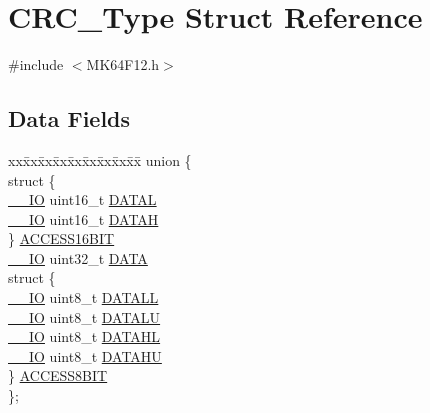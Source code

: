 \hypertarget{struct_c_r_c___type}{}\section{C\+R\+C\+\_\+\+Type Struct Reference}
\label{struct_c_r_c___type}


{\ttfamily \#include $<$M\+K64\+F12.\+h$>$}

\subsection*{Data Fields}
\begin{DoxyCompactItemize}
\item 
\begin{tabbing}
xx\=xx\=xx\=xx\=xx\=xx\=xx\=xx\=xx\=\kill
union \{\\
\>struct \{\\
\>\>\mbox{\hyperlink{core__cm4_8h_aec43007d9998a0a0e01faede4133d6be}{\_\_IO}} uint16\_t \mbox{\hyperlink{group___v_r_e_f___peripheral___access___layer_ga44be1f08c4a0d20cf3bdb48bf3663b70}{DATAL}}\\
\>\>\mbox{\hyperlink{core__cm4_8h_aec43007d9998a0a0e01faede4133d6be}{\_\_IO}} uint16\_t \mbox{\hyperlink{group___v_r_e_f___peripheral___access___layer_ga3eb82fbd05f954f025010a891f8028a9}{DATAH}}\\
\>\} \mbox{\hyperlink{group___v_r_e_f___peripheral___access___layer_ga8367369d606f023fe86d3d8587b86857}{ACCESS16BIT}}\\
\>\mbox{\hyperlink{core__cm4_8h_aec43007d9998a0a0e01faede4133d6be}{\_\_IO}} uint32\_t \mbox{\hyperlink{group___v_r_e_f___peripheral___access___layer_ga54cb6b41986c241ca85af803e9cd6101}{DATA}}\\
\>struct \{\\
\>\>\mbox{\hyperlink{core__cm4_8h_aec43007d9998a0a0e01faede4133d6be}{\_\_IO}} uint8\_t \mbox{\hyperlink{group___v_r_e_f___peripheral___access___layer_ga163f838a6515d380cb432907c426bc64}{DATALL}}\\
\>\>\mbox{\hyperlink{core__cm4_8h_aec43007d9998a0a0e01faede4133d6be}{\_\_IO}} uint8\_t \mbox{\hyperlink{group___v_r_e_f___peripheral___access___layer_ga1ef159257b3795329d68a57e5cc30643}{DATALU}}\\
\>\>\mbox{\hyperlink{core__cm4_8h_aec43007d9998a0a0e01faede4133d6be}{\_\_IO}} uint8\_t \mbox{\hyperlink{group___v_r_e_f___peripheral___access___layer_ga1ae430029da74ff7be05faacdc59576e}{DATAHL}}\\
\>\>\mbox{\hyperlink{core__cm4_8h_aec43007d9998a0a0e01faede4133d6be}{\_\_IO}} uint8\_t \mbox{\hyperlink{group___v_r_e_f___peripheral___access___layer_gae47c42d55e7ad2cdd02f961ee06b5573}{DATAHU}}\\
\>\} \mbox{\hyperlink{group___v_r_e_f___peripheral___access___layer_ga1a9fb7a1d60dc0d0d9230c256fa05978}{ACCESS8BIT}}\\
\}; \\


\end{tabbing}
\end{DoxyCompactItemize}
